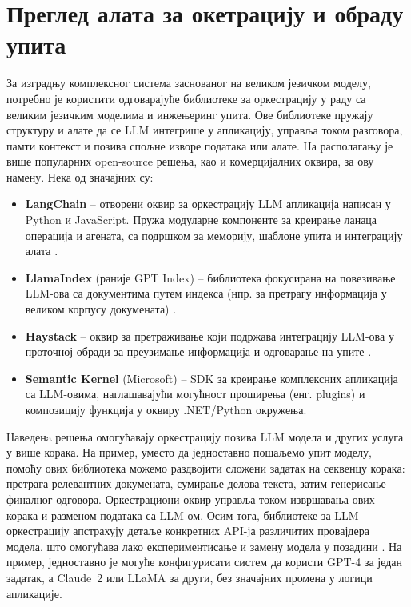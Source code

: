 \section{Преглед алата за окетрацију и обраду упита}

За изградњу комплексног система заснованог на великом језичком моделу, потребно је користити одговарајуће библиотеке за оркестрацију у раду са великим језичким моделима и инжењеринг упита. Ове библиотеке пружају структуру и алате да се LLM интегрише у апликацију, управља током разговора, памти контекст и позива спољне изворе података или алате. На располагању је више популарних open-source решења, као и комерцијалних оквира, за ову намену. Нека од значајних су:
\newline

\begin{itemize}
    \item \textbf{LangChain} -- отворени оквир за оркестрацију LLM апликација написан у Python и JavaScript. Пружа модуларне компоненте за креирање ланаца операција и агената, са подршком за меморију, шаблоне упита и интеграцију алата \cite{ibm_what_is_langchain_2023,patriwala_langchain_2025}.
    \item \textbf{LlamaIndex} (раније GPT Index) -- библиотека фокусирана на повезивање LLM-ова са документима путем индекса (нпр. за претрагу информација у великом корпусу докумената) \cite{patriwala_langchain_2025}.
    \item \textbf{Haystack} -- оквир за претраживање који подржава интеграцију LLM-ова у проточној обради за преузимање информација и одговарање на упите \cite{patriwala_langchain_2025}.
    \item \textbf{Semantic Kernel} (Microsoft) -- SDK за креирање комплексних апликација са LLM-овима, наглашавајући могућност проширења (енг. plugins) и композицију функција у оквиру .NET/Python окружења.
\end{itemize}

Наведенa решења омогућавају оркестрацију позива LLM модела и других услуга у више корака. На пример, уместо да једноставно пошаљемо упит моделу, помоћу ових библиотека можемо раздвојити сложени задатак на секвенцу корака: претрага релевантних докумената, сумирање делова текста, затим генерисање финалног одговора. Оркестрациони оквир управља током извршавања ових корака и разменом података са LLM-ом. Осим тога, библиотеке за LLM оркестрацију апстрахују детаље конкретних API-ја различитих провајдера модела, што омогућава лако експериментисање и замену модела у позадини \cite{ibm_what_is_langchain_2023,patriwala_langchain_2025}. На пример, једноставно је могуће конфигурисати систем да користи GPT-4 за један задатак, а Claude~2 или LLaMA за други, без значајних промена у логици апликације.
\newline

